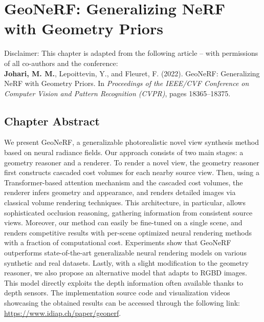 \chapter{GeoNeRF: Generalizing NeRF with Geometry Priors} \label{sec:chapter3}

\begin{tcolorbox}[colback=gray!20, boxrule=1pt, colframe=black]
  Disclaimer: This chapter is adapted from the following article – with permissions of all co-authors and the conference: \\

    \textbf{Johari, M. M.}, Lepoittevin, Y., and Fleuret, F. (2022). GeoNeRF: Generalizing NeRF with Geometry Priors. In \textit{Proceedings of the IEEE/CVF Conference on Computer Vision and Pattern Recognition (CVPR)}, pages 18365–18375.
\end{tcolorbox}

\section{Chapter Abstract}

We present GeoNeRF, a generalizable photorealistic novel view synthesis method based on neural radiance fields. Our approach consists of two main stages: a geometry reasoner and a renderer. To render a novel view, the geometry reasoner first constructs cascaded cost volumes for each nearby source view. Then, using a Transformer-based attention mechanism and the cascaded cost volumes, the renderer infers geometry and appearance, and renders detailed images via classical volume rendering techniques. This architecture, in particular, allows sophisticated occlusion reasoning, gathering information from consistent source views. Moreover, our method can easily be fine-tuned on a single scene, and renders competitive results with per-scene optimized neural rendering methods with a fraction of computational cost. Experiments show that GeoNeRF outperforms state-of-the-art generalizable neural rendering models on various synthetic and real datasets. Lastly, with a slight modification to the geometry reasoner, we also propose an alternative model that adapts to RGBD images. This model directly exploits the depth information often available thanks to depth sensors. The implementation source code and visualization videos showcasing the obtained results can be accessed through the following link: \href{https://www.idiap.ch/paper/geonerf}{https://www.idiap.ch/paper/geonerf}.

